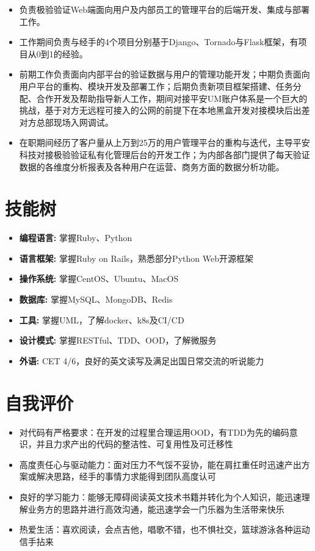 \documentclass[11pt, a4paper,sans]{moderncv}   %
\begin{document}
\begin{itemize}
    \begin{itemize}\yahei
      \item 负责极验验证Web端面向用户及内部员工的管理平台的后端开发、集成与部署工作。
      \item 工作期间负责与经手的4个项目分别基于Django、Tornado与Flask框架，有项目从0到1的经验。
      \item 前期工作负责面向内部平台的验证数据与用户的管理功能开发；中期负责面向用户平台的重构、模块开发及部署工作；后期负责新项目框架搭建、任务分配、合作开发及帮助指导新人工作，期间对接平安UM账户体系是一个巨大的挑战，基于对方无远程可接入的公网的前提下在本地黑盒开发对接模块后出差对方总部现场入网调试。
      \item 在职期间经历了客户量从上万到25万的用户管理平台的重构与迭代，主导平安科技对接极验验证私有化管理后台的开发工作；为内部各部门提供了每天验证数据的各维度分析报表及各种用户在运营、商务方面的数据分析功能。
    \end{itemize}

\end{itemize}
\vspace{-8pt}

\section{\yahei 技能树}
\begin{itemize}
  \item{\yahei \textbf{编程语言:} 掌握Ruby、Python}
  \item{\yahei \textbf{语言框架:} 掌握Ruby on Rails，熟悉部分Python Web开源框架}
  \item{\yahei \textbf{操作系统:} 掌握CentOS、Ubuntu、MacOS}
  \item{\yahei \textbf{数据库:} 掌握MySQL、MongoDB、Redis}
  \item{\yahei \textbf{工具:} 掌握UML，了解docker、k8s及CI/CD}
  \item{\yahei \textbf{设计模式:} 掌握RESTful、TDD、OOD，了解微服务}
  \item{\yahei \textbf{外语:} CET 4/6，良好的英文读写及满足出国日常交流的听说能力}
\end{itemize}
\vspace{-8pt}

\section{\yahei 自我评价}

\begin{itemize}
  \item{\yahei 对代码有严格要求：在开发的过程里合理运用OOD，有TDD为先的编码意识，并且力求产出的代码的整洁性、可复用性及可迁移性}
  \item{\yahei 高度责任心与驱动能力：面对压力不气馁不妥协，能在肩扛重任时迅速产出方案或解决思路，经手的事情力求能得到团队高度认可}
  \item{\yahei 良好的学习能力：能够无障碍阅读英文技术书籍并转化为个人知识，能迅速理解业务方的思路并进行高效沟通，能迅速学会一门乐器为生活带来快乐}
  \item{\yahei 热爱生活：喜欢阅读，会点吉他，唱歌不错，也不惧社交，篮球游泳各种运动信手拈来}
\end{itemize}
\end{document}
